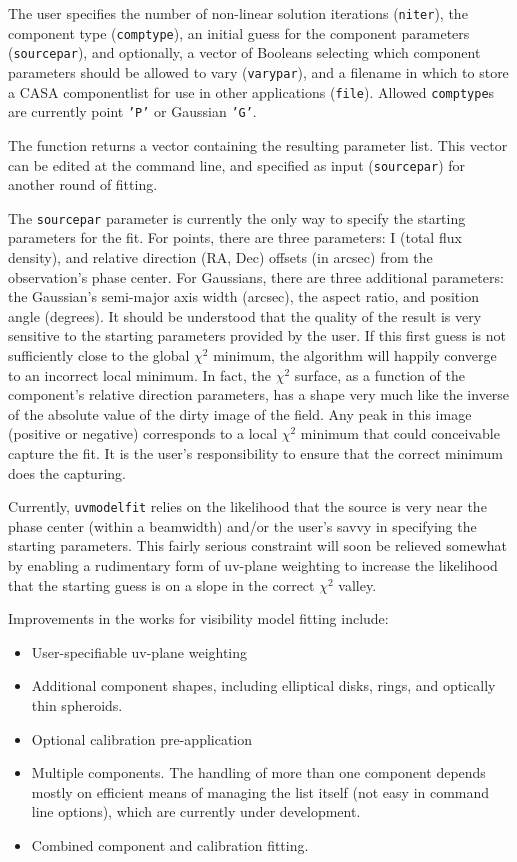 The user specifies the number of non-linear solution
iterations ({\tt niter}), the component type ({\tt comptype}), an
initial guess for the component parameters ({\tt sourcepar}), and
optionally, a vector of Booleans selecting which component parameters
should be allowed to vary ({\tt varypar}), and a filename in which to
store a CASA componentlist for use in other applications ({\tt file}).
Allowed {\tt comptype}s are currently point {\tt 'P'} or
Gaussian {\tt 'G'}.

The function returns a vector containing the resulting parameter list.
This vector can be edited at the command line, and specified as input
({\tt sourcepar}) for another round of fitting.

The {\tt sourcepar} parameter is currently the only way to specify the
starting parameters for the fit.  For points, there are three
parameters: I (total flux density), and relative direction (RA, Dec)
offsets (in arcsec) from the observation's phase center.  For
Gaussians, there are three additional parameters: the Gaussian's
semi-major axis width (arcsec), the aspect ratio, and position angle
(degrees).  It should be understood that the quality of the result is
very sensitive to the starting parameters provided by the user.  If
this first guess is not sufficiently close to the global $\chi^2$
minimum, the algorithm will happily converge to an incorrect local
minimum.  In fact, the $\chi^2$ surface, as a function of the
component's relative direction parameters, has a shape very much like
the inverse of the absolute value of the dirty image of the field.
Any peak in this image (positive or negative) corresponds to a local
$\chi^2$ minimum that could conceivable capture the fit.  It is the
user's responsibility to ensure that the correct minimum does the
capturing.

Currently, {\tt uvmodelfit} relies on the likelihood that the source
is very near the phase center (within a beamwidth) and/or the user's
savvy in specifying the starting parameters.  This fairly serious
constraint will soon be relieved somewhat by enabling a rudimentary
form of uv-plane weighting to increase the likelihood that the
starting guess is on a slope in the correct $\chi^2$ valley.

Improvements in the works for visibility model fitting include:

\begin{itemize}
   \item User-specifiable uv-plane weighting
   \item Additional component shapes, including elliptical disks, rings,
         and optically thin spheroids.
   \item Optional calibration pre-application
   \item Multiple components.  The handling of more than one component
         depends mostly on efficient means of managing the list itself (not easy in
         command line options), which are currently under development.
   \item Combined component and calibration fitting.
\end{itemize}

